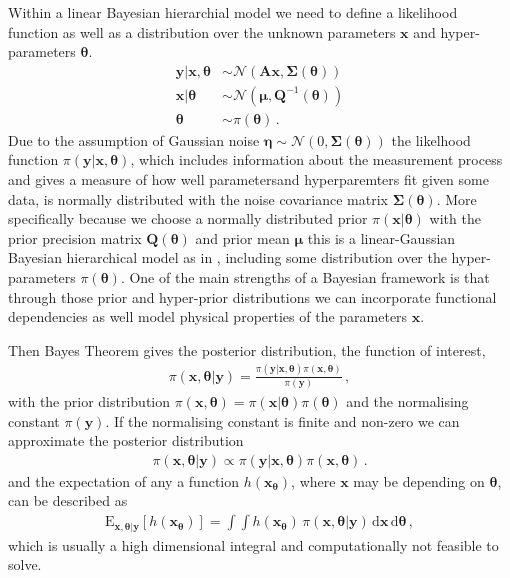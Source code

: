 Within a linear Bayesian hierarchial model we need to define a likelihood function as well as a distribution over the unknown parameters $\bm{x}$ and hyper-parameters $\bm{\theta}$.
\begin{subequations}
	\begin{align}
		\bm{y}|\bm{x}, \bm{\theta}&\sim \mathcal{N}(\bm{A} \bm{x}, \bm{\Sigma}(\bm{\theta})) \label{eq:likelihood}  \\
		\bm{x}| \bm{\theta} & \sim  \mathcal{N}( \bm{\mu}, \bm{Q}^{-1}(\bm{\theta})  ) \label{eq:xPrior} \\
		\bm{\theta} &\sim  \pi(\bm{\theta}) \label{eq:gammaPrior}\, .
	\end{align}
	\label{eq:BayMode}
\end{subequations}
Due to the assumption of Gaussian noise $\bm{\eta} \sim \mathcal{N}(0, \bm{\Sigma}(\bm{\theta})) $ the likelhood function $\pi(\bm{y}|\bm{x}, \bm{\theta})$, which includes information about the measurement process and gives a measure of how well parametersand  hyperparemters fit given some data, is normally distributed with the noise covariance matrix $\bm{\Sigma}(\bm{\theta})$. 
More specifically because we choose a normally distributed prior $\pi(\bm{x}| \bm{\theta})$ with the prior precision matrix $\bm{Q}(\bm{\theta})$ and prior mean $\bm{\mu}$ this is a linear-Gaussian Bayesian hierarchical model as in \cite{fox2016fast}, including some distribution over the hyper-parameters $\pi(\bm{\theta})$.
One of the main strengths of a Bayesian framework is that through those prior and hyper-prior distributions we can incorporate functional dependencies as well model physical properties of the parameters $\bm{x}$. 

Then Bayes Theorem gives the posterior distribution, the function of interest,
\begin{align}
	\pi(\bm{x},\bm{\theta}|\bm{y}) = \frac{ \pi(\bm{y} | \bm{x}, \bm{\theta} ) \pi(\bm{x}, \bm{\theta})}{\pi(\bm{y})} \, ,
\end{align}
with the prior distribution $\pi(\bm{x}, \bm{\theta}) = \pi(\bm{x}| \bm{\theta}) \pi(\bm{\theta}) $ and the normalising constant $\pi(\bm{y})$.
If the normalising constant is finite and non-zero we can approximate the posterior distribution
\begin{align}
	\pi(\bm{x},\bm{\theta}|\bm{y}) \propto \pi(\bm{y} | \bm{x}, \bm{\theta} ) \pi(\bm{x}, \bm{\theta}) \, .
\end{align}
and the expectation of any a function $h(\bm{x}_{\bm{\theta}})$, where $\bm{x}$ may be depending on $\bm{\theta}$, can be described as 
\begin{align}
	\text{E}_{\bm{x},\bm{\theta}|\bm{y}} [h(\bm{x}_{\bm{\theta}})] =  \int \int   h(\bm{x}_{\bm{\theta}}) \,  \pi(\bm{x}, \bm{\theta} | \bm{y} ) \, \text{d} \bm{x}  \, \text{d} \bm{\theta}   \label{eq:expPos} \, ,
\end{align}
which is usually a high dimensional integral and computationally not feasible to solve.


